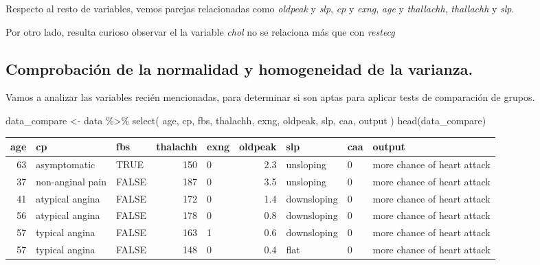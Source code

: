 \documentclass[
]{article}
\newenvironment{Shaded}{\begin{snugshade}}{\end{snugshade}}
\newcommand{\FunctionTok}[1]{\textcolor[rgb]{0.00,0.00,0.00}{#1}}
\newcommand{\NormalTok}[1]{#1}
\newcommand{\OtherTok}[1]{\textcolor[rgb]{0.56,0.35,0.01}{#1}}
\newcommand{\SpecialCharTok}[1]{\textcolor[rgb]{0.00,0.00,0.00}{#1}}
\begin{document}
Respecto al resto de variables, vemos parejas relacionadas como
\emph{oldpeak} y \emph{slp}, \emph{cp} y \emph{exng}, \emph{age} y
\emph{thallachh}, \emph{thallachh} y \emph{slp}.

Por otro lado, resulta curioso observar el la variable \emph{chol} no se
relaciona más que con \emph{restecg}

\hypertarget{comprobaciuxf3n-de-la-normalidad-y-homogeneidad-de-la-varianza.}{%
\subsection{Comprobación de la normalidad y homogeneidad de la
varianza.}\label{comprobaciuxf3n-de-la-normalidad-y-homogeneidad-de-la-varianza.}}

Vamos a analizar las variables recién mencionadas, para determinar si
son aptas para aplicar tests de comparación de grupos.

\begin{Shaded}
\begin{Highlighting}[]
\NormalTok{data\_compare }\OtherTok{\textless{}{-}}\NormalTok{ data }\SpecialCharTok{\%\textgreater{}\%} 
  \FunctionTok{select}\NormalTok{(}
\NormalTok{    age,}
\NormalTok{    cp,}
\NormalTok{    fbs,}
\NormalTok{    thalachh,}
\NormalTok{    exng,}
\NormalTok{    oldpeak,}
\NormalTok{    slp,}
\NormalTok{    caa,}
\NormalTok{    output}
\NormalTok{  )}
\FunctionTok{head}\NormalTok{(data\_compare)}
\end{Highlighting}
\end{Shaded}

\begin{tabular}{r|l|l|r|l|r|l|l|l}
\hline
age & cp & fbs & thalachh & exng & oldpeak & slp & caa & output\\
\hline
63 & asymptomatic & TRUE & 150 & 0 & 2.3 & unsloping & 0 & more chance of heart attack\\
\hline
37 & non-anginal pain & FALSE & 187 & 0 & 3.5 & unsloping & 0 & more chance of heart attack\\
\hline
41 & atypical angina & FALSE & 172 & 0 & 1.4 & downsloping & 0 & more chance of heart attack\\
\hline
56 & atypical angina & FALSE & 178 & 0 & 0.8 & downsloping & 0 & more chance of heart attack\\
\hline
57 & typical angina & FALSE & 163 & 1 & 0.6 & downsloping & 0 & more chance of heart attack\\
\hline
57 & typical angina & FALSE & 148 & 0 & 0.4 & flat & 0 & more chance of heart attack\\
\hline
\end{tabular}
\end{document}
